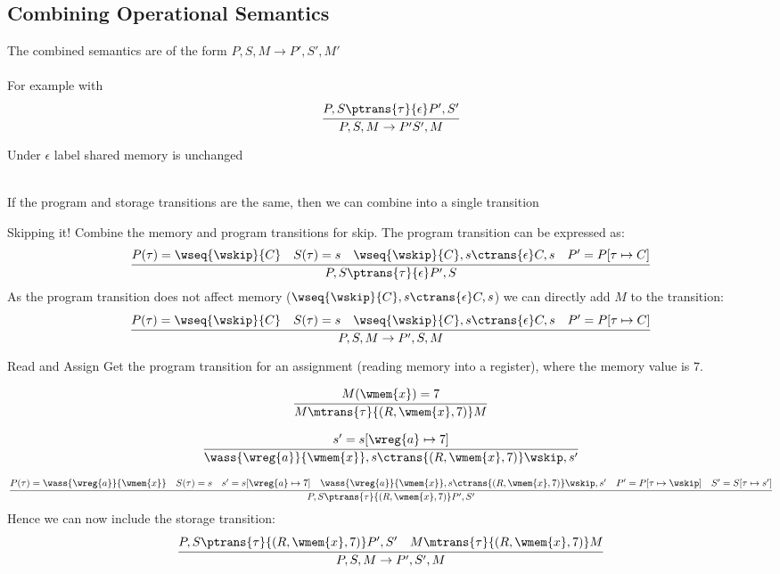 \subsection{Combining Operational Semantics}
The combined semantics are of the form $P, S, M \to P', S', M'$
\\
\\ For example with
\[\cfrac{
		P, S \ptrans{\tau}{\epsilon} P', S'
	}{
		P, S, M \to P' S', M
	}\]
\centerline{Under $\epsilon$ label shared memory is unchanged}
\\
If the program and storage transitions are the same, then we can combine into a single transition
\begin{examplebox}{Skipping it!}
	Combine the memory and program transitions for skip.
	\tcblower
	The program transition can be expressed as:
	\[\cfrac{
			P(\tau) = \wseq{\wskip}{C} \quad S(\tau) = s \quad \wseq{\wskip}{C}, s \ctrans{\epsilon} C,s \quad P' = P[\tau \mapsto C]
		}{
			P, S \ptrans{\tau}{\epsilon} P', S
		}\]
	As the program transition does not affect memory ($\wseq{\wskip}{C}, s \ctrans{\epsilon} C,s$) we can directly add $M$ to the transition:
	\[\cfrac{
			P(\tau) = \wseq{\wskip}{C} \quad S(\tau) = s \quad \wseq{\wskip}{C}, s \ctrans{\epsilon} C,s \quad P' = P[\tau \mapsto C]
		}{
			P, S, M \to P', S, M
		}\]
\end{examplebox}
\begin{examplebox}{Read and Assign}
	Get the program transition for an assignment (reading memory into a register), where the memory value is $7$.
	\tcblower
	\begin{minipage}{.5\textwidth}
		\[\cfrac
			{
				M(\wmem{x}) = 7
			}{
				M \mtrans{\tau}{(R, \wmem{x}, 7)} M
			}
		\]
	\end{minipage}
	\begin{minipage}{.5\textwidth}
		\[\cfrac{
				s' = s[\wreg{a} \mapsto 7]
			}{
				\wass{\wreg{a}}{\wmem{x}}, s \ctrans{(R, \wmem{x}, 7)} \wskip, s'
			}\]
	\end{minipage}

	\[\cfrac{
			P(\tau) = \wass{\wreg{a}}{\wmem{x}} \quad S(\tau) = s \quad s' = s[\wreg{a} \mapsto 7] \quad \wass{\wreg{a}}{\wmem{x}},s \ctrans{(R, \wmem{x}, 7)} \wskip, s' \quad P' = P[\tau \mapsto \wskip] \quad S' = S[\tau \mapsto s']
		}{
			P,S \ptrans{\tau}{(R, \wmem{x}, 7)} P', S'
		}\]
	Hence we can now include the storage transition:
	\[\cfrac{
			P,S \ptrans{\tau}{(R, \wmem{x}, 7)} P', S' \quad M \mtrans{\tau}{(R, \wmem{x}, 7)} M
		}{
			P, S, M \to P', S', M
		}\]
\end{examplebox}

